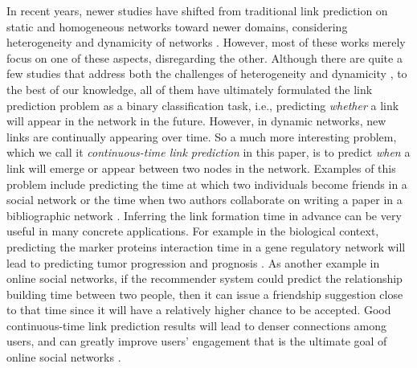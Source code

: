 In recent years, newer studies have shifted from traditional link prediction on static and homogeneous networks toward newer domains, considering heterogeneity and dynamicity of networks \cite{dong2012link, davis2011multi, 7752228, hajibagheri2016leveraging, moradabadi2017novel}. However, most of these works merely focus on one of these aspects, disregarding the other. Although there are quite a few studies that address both the challenges of heterogeneity and dynamicity \cite{aggarwal2012dynamic, sett2017temporal}, to the best of our knowledge, all of them have ultimately formulated the link prediction problem as a binary classification task, i.e., predicting \emph{whether} a link will appear in the network in the future. However, in dynamic networks, new links are continually appearing over time. So a much more interesting problem, which we call it \emph{continuous-time link prediction} in this paper, is to predict \emph{when} a link will emerge or appear between two nodes in the network. Examples of this problem include predicting the time at which two individuals become friends in a social network or the time when two authors collaborate on writing a paper in a bibliographic network \cite{sun2012will}. Inferring the link formation time in advance can be very useful in many concrete applications. For example in the biological context, predicting the marker proteins interaction time in a gene regulatory network will lead to predicting tumor progression and prognosis \cite{taylor2009dynamic}. As another example in online social networks, if the recommender system could predict the relationship building time between two people, then it can issue a friendship suggestion close to that time since it will have a relatively higher chance to be accepted. Good continuous-time link prediction results will lead to denser connections among users, and can greatly improve users' engagement that is the ultimate goal of online social networks \cite{kwak2010twitter}.

